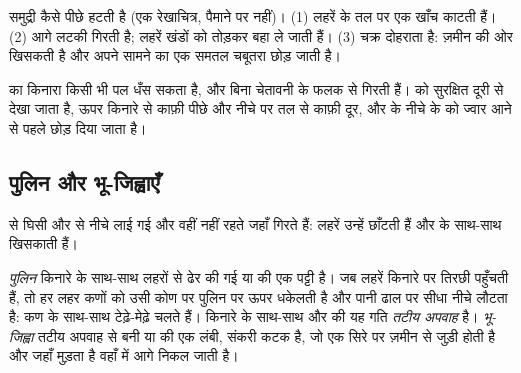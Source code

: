 \begin{omfigure}
{\small समुद्री  कैसे पीछे हटती है (एक रेखाचित्र, पैमाने पर नहीं)। (1) लहरें  के
तल पर एक खाँच काटती हैं। (2) आगे लटकी  गिरती है; लहरें खंडों को तोड़कर बहा ले जाती
हैं। (3) चक्र दोहराता है:  ज़मीन की ओर खिसकती है और अपने सामने  का एक समतल
चबूतरा छोड़ जाती है।}
\label{fig:g9:landforms:cliff-retreat}
\end{omfigure}

\begin{safety}
 का किनारा किसी भी पल धँस सकता है, और  बिना चेतावनी के फलक से गिरती हैं। 
को सुरक्षित दूरी से देखा जाता है, ऊपर किनारे से काफ़ी पीछे और नीचे  पर तल से काफ़ी दूर,
और  के नीचे के  को ज्वार आने से पहले छोड़ दिया
जाता है।
\end{safety}

\subsection{पुलिन और भू-जिह्वाएँ}

 से घिसी और  से नीचे लाई गई  और  वहीं नहीं रहते जहाँ गिरते हैं: लहरें
उन्हें छाँटती हैं और  के साथ-साथ खिसकाती हैं।

\begin{definition}[पुलिन, तटीय अपवाह और भू-जिह्वा]\label{def:g9:landforms:beach}
\emph{पुलिन} किनारे के साथ-साथ लहरों से ढेर की गई  या  की एक
पट्टी है। जब लहरें किनारे पर तिरछी पहुँचती हैं, तो हर लहर कणों को उसी कोण पर पुलिन पर ऊपर
धकेलती है और पानी ढाल पर सीधा नीचे लौटता है: कण  के साथ-साथ टेढ़े-मेढ़े चलते हैं। किनारे
के साथ-साथ  और  की यह गति \emph{तटीय
अपवाह} है। \emph{भू-जिह्वा} तटीय अपवाह से
बनी  या  की एक लंबी, संकरी कटक है, जो एक सिरे पर ज़मीन से जुड़ी होती है और जहाँ
 मुड़ता है वहाँ  में आगे निकल जाती
है।
\end{definition}

